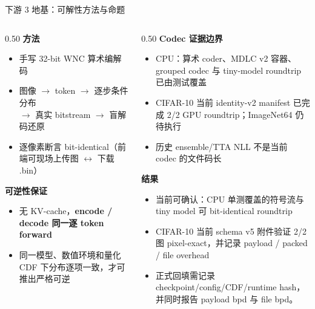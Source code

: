 \documentclass[10pt,aspectratio=169]{beamer}
\begin{document}
\begin{frame}{下游 3 地基：可解性方法与命题}
\begin{columns}[T]
\begin{column}{0.50\textwidth}
\small
\textbf{方法}
\begin{itemize}\setlength{\itemsep}{2pt}
  \item 手写 32-bit WNC 算术编解码
  \item 图像 $\to$ token $\to$ 逐步条件分布 \\
        $\to$ 真实 bitstream $\to$ 盲解码还原
  \item 逐像素断言 bit-identical（前端可现场上传图 $\leftrightarrow$ 下载 .bin）
\end{itemize}

\bigskip
\textbf{可逆性保证}
\begin{itemize}
  \item 无 KV-cache，\textbf{encode / decode 同一逐 token forward}
  \item 同一模型、数值环境和量化 CDF 下分布逐项一致，才可推出严格可逆
\end{itemize}
\end{column}
\begin{column}{0.50\textwidth}
\small
\textbf{Codec 证据边界}
\begin{itemize}\setlength{\itemsep}{2pt}
  \item CPU：算术 coder、MDLC v2 容器、grouped codec 与 tiny-model roundtrip 已由测试覆盖
  \item CIFAR-10 当前 identity-v2 manifest 已完成 2/2 GPU roundtrip；ImageNet64 仍待执行
  \item 历史 ensemble/TTA NLL 不是当前 codec 的文件码长
\end{itemize}

\bigskip
\textbf{结果}
\begin{itemize}\setlength{\itemsep}{2pt}
  \item 当前可确认：CPU 单测覆盖的符号流与 tiny model 可 bit-identical roundtrip
  \item CIFAR-10 当前 schema v5 附件验证 2/2 图 pixel-exact，并记录 payload / packed / file overhead
  \item {\scriptsize 正式回填需记录 checkpoint/config/CDF/runtime hash，并同时报告 payload bpd 与 file bpd。}
\end{itemize}
\end{column}
\end{columns}
\end{frame}
\end{document}

